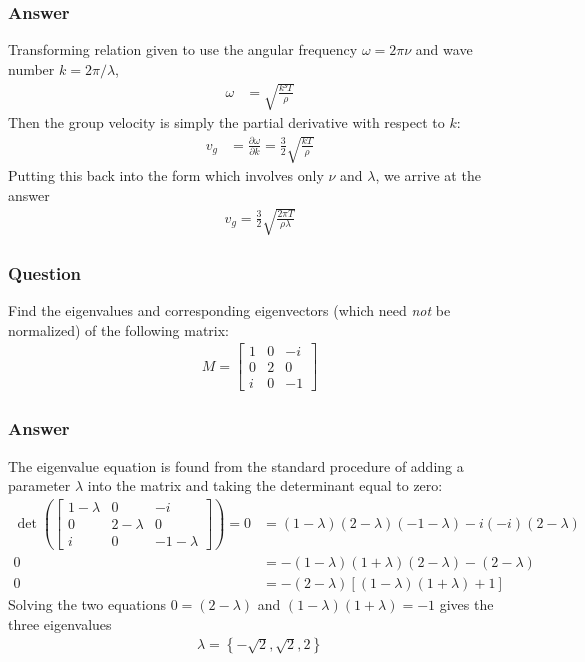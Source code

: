 \subsubsection{Answer}

Transforming relation given to use the angular frequency $ω = 2πν$ and
wave number $k = 2π/λ$,
\begin{align*}
    ω &= \sqrt{ \frac{k³T}{ρ} }
\end{align*}
Then the group velocity is simply the partial derivative with respect to $k$:
\begin{align*}
    v_g &= \frac{∂ω}{∂k} = \frac 32 \sqrt{\frac{kT}{ρ}}
\end{align*}
Putting this back into the form which involves only $ν$ and $λ$, we arrive at
the answer
\begin{align}
    \boxed{ v_g = \frac 32 \sqrt{\frac{2πT}{ρλ}} }
\end{align}

\subsubsection{Question}

Find the eigenvalues and corresponding eigenvectors (which need \emph{not} be
normalized) of the following matrix:
\begin{align*}
    M = \begin{bmatrix}
	1 & 0 & -i \\
	0 & 2 & 0 \\
	i & 0 & -1
    \end{bmatrix}
\end{align*}

\subsubsection{Answer}

The eigenvalue equation is found from the standard procedure of adding a
parameter $λ$ into the matrix and taking the determinant equal to zero:
\begin{align*}
    \det ( \begin{bmatrix}
	1-λ & 0   & -i   \\
	0   & 2-λ & 0    \\
	i   & 0   & -1-λ
    \end{bmatrix} ) = 0 &= (1-λ)(2-λ)(-1-λ) - i(-i)(2-λ) \\
    0 &= -(1-λ)(1+λ)(2-λ) - (2-λ) \\
    0 &= -(2-λ)\left[ (1-λ)(1+λ) + 1 \right]
\end{align*}
Solving the two equations $0 = (2 - λ)$ and $(1-λ)(1+λ) = -1$ gives the three
eigenvalues
\begin{align}
    \boxed{
    λ = \left\{ -\sqrt 2, \sqrt 2, 2 \right\}
    }
\end{align}

